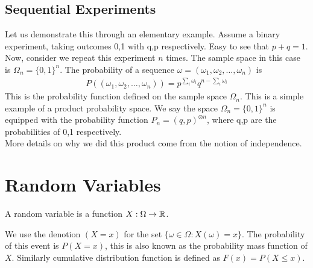 \subsection{Sequential Experiments}
Let us demonstrate this through an elementary example. Assume a binary experiment, taking outcomes 0,1 with q,p respectively. Easy to see that $p+q=1$. Now, consider we repeat this experiment $n$ times. 
The sample space in this case is $\Omega_n=\{0,1\}^n$. The probability of a sequence $\omega=(\omega_1,\omega_2,\ldots,\omega_n)$ is 
\begin{align}
    P((\omega_1,\omega_2,\ldots,\omega_n))=p^{\sum_i{\omega_i}}q^{n-\sum_i{\omega_i}}
\end{align}
This is the probability function defined on the sample space $\Omega_n$. This is a simple example of a product probability space. We say the space $\Omega_n=\{0,1\}^n$ is equipped with the probability function $P_n=(q,p)^{\otimes n}$, where q,p are the probabilities of 0,1 respectively. 
\\More details on why we did this product come from the notion of independence.
\section{Random Variables}
\begin{definition}
    A random variable is a function $X:\Omega \to \mathbb{R}$.
\end{definition}
We use the denotion $(X=x)$ for the set $\{\omega \in \Omega : X(\omega)=x\}$. The probability of this event is $P(X=x)$, this is also known as the probability mass function of $X$. Similarly cumulative distribution function is defined as $F(x)=P(X \leq x)$.

